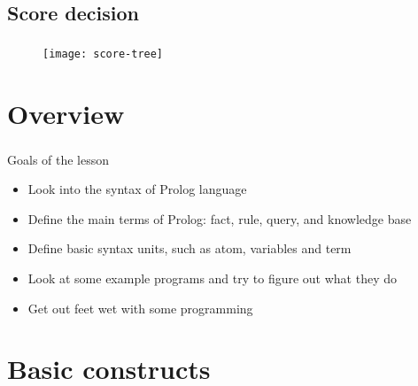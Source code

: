 \subsection{Score decision}

\begin{frame}
	\frametitle{\insertsection}
	\framesubtitle{\insertsubsection}
	\begin{figure}
		\texttt{[image: score-tree]}
	\end{figure}
\end{frame}


\section{Overview}

\begin{frame}
	\frametitle{\insertsection}
	Goals of the lesson
	\begin{itemize}
		\item Look into the syntax of Prolog language
		\item Define the main terms of Prolog: fact, rule, query, and knowledge base
		\item Define basic syntax units, such as atom, variables and term
		\item Look at some example programs and try to figure out what they do
		\item Get out feet wet with some programming
	\end{itemize}
\end{frame}


\section{Basic constructs}

